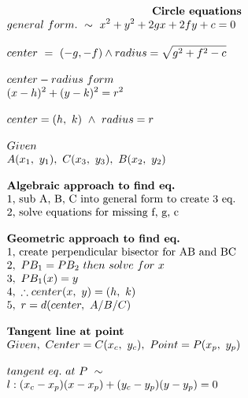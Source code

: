 \documentclass{article}
\begin{document}
\setlength{\columnsep}{3cm}
\begin{multicols}{2}
    \noindent 
    \[
        \\
        \\
    \begin{array}{>{\displaystyle}l}
        \centerline{$\textbf{Circle\ equations}$}\\
        general\ form.\ \sim \ x^{2} +y^{2} +2gx+2fy+c=0\\
        \\
        center\ =\ ( -g,-f) \land radius=\sqrt{g^{2} +f^{2} -c} \ \\
        \\
        center-radius\ form\\
        ( x-h)^{2} +( y-k)^{2} =r^{2}\\
        \\
        center=( h,\ k) \ \land \ radius=r\\
        \\
        Given\\
        A( x_{1} ,\ y_{1}),\ C( x_{3} ,\ y_{3}),\ B( x_{2} ,\ y_{2})\\
        \\
        \textbf{Algebraic\ approach\ to\ find\ eq.} \\
        \text{1,\ sub\ A,\ B,\ C\ into\ general\ form\ to\ create\ 3\ eq.} \\
        \text{2,\ solve\ equations\ for\ missing\ f,\ g,\ c} \\
        \\
        \textbf{Geometric\ approach\ to\ find\ eq.} \\
        \text{1,\ create\ perpendicular\ bisector\ for\ AB\ and\ BC} \\
        2,\ PB_{1} =PB_{2} \ then\ solve\ for\ x\\
        3,\ PB_{1}( x) =y\\
        4,\ \therefore center( x,\ y) =( h,\ k)\\
        5,\ r=d( center,\ A/B/C)\\
        \\
        \textbf{Tangent line at point}\ \\
        Given,\ Center=C( x_{c} ,\ y_{c}) ,\ Point=P( x_{p} ,\ y_{p})\\
        \\
        tangent\ eq.\ at\ P\ \sim \\
        l:( x_{c} -x_{p})( x-x_{p}) +( y_{c} -y_{p})( y-y_{p}) =0
    \end{array}
\]
\end{multicols}
\end{document}
